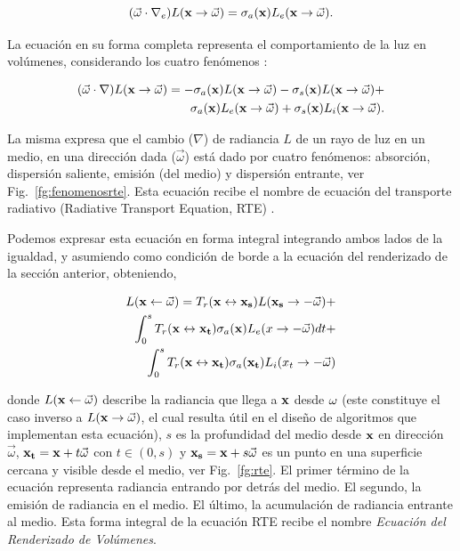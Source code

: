 $$ (\vec{\omega} \cdot \nabla_{e}) L(\bold{x} \rightarrow \vec{\omega}) = \sigma_{a}(\bold{x}) L_{e}(\bold{x} \rightarrow \vec{\omega}).$$

La ecuación en su forma completa representa el comportamiento de la luz en volúmenes, considerando los cuatro fenómenos \cite{Jarosz2008}:

\begin{equation}
\begin{aligned}
(\vec{\omega} \cdot \nabla) L(\bold{x} \rightarrow \vec{\omega}) = - \sigma_{a}(\bold{x}) L(\bold{x} \rightarrow \vec{\omega}) - \sigma_{s}(\bold{x}) L(\bold{x} \rightarrow \vec{\omega}) + \\
\sigma_{a}(\bold{x}) L_{e}(\bold{x} \rightarrow \vec{\omega}) + \sigma_{s}(\bold{x}) L_{i}(\bold{x} \rightarrow \vec{\omega}).
\end{aligned}
\label{eq:rte}
\end{equation}

La misma expresa que el cambio ($\nabla$) de radiancia $L$ de un rayo de luz en un medio, en una dirección dada ($\vec{\omega}$) está dado por cuatro fenómenos: absorción, dispersión saliente, emisión (del medio) y dispersión entrante, ver Fig.~\ref{fg:fenomenosrte}.
Esta ecuación recibe el nombre de ecuación del transporte radiativo (Radiative Transport Equation, \acrshort{RTE}) \cite{Chandrasekhar1960}.

Podemos expresar esta ecuación en forma integral integrando ambos lados de la igualdad, y asumiendo como condición de borde a la ecuación del renderizado de la sección anterior, obteniendo,

\begin{equation}
\begin{aligned}
L(\bold{x} \leftarrow \vec{\omega}) = T_{r}(\bold{x} \leftrightarrow \bold{x_{s}}) L(\bold{x_{s}} \rightarrow -\vec{\omega}) + \\
\int_{0}^{s}{T_{r}(\bold{x} \leftrightarrow \bold{x_{t}}) \sigma_{a}(\bold{x}) L_{e}(x \rightarrow -\vec{\omega}) dt } + \\
\int_{0}^{s}{T_{r}(\bold{x} \leftrightarrow \bold{x_{t}}) \sigma_{a}(\bold{x_{t}}) L_{i}(x_{t} \rightarrow -\vec{\omega})  }
\end{aligned}
\label{eq:rteintegral}
\end{equation}

\noindent donde $L(\bold{x} \leftarrow \vec{\omega})$ describe la radiancia que llega a $\bold{x}$ desde $\bold{\omega}$ (este constituye el caso inverso a $L(\bold{x} \rightarrow {\vec{\omega}})$, el cual resulta útil en el diseño de algoritmos que implementan esta ecuación), $s$ es la profundidad del medio desde $\bold{x}$ en dirección $\vec{\omega}$, $\bold{x_{t}} = \bold{x} + t\vec{\omega}$ con $t \in (0,s)$ y $\bold{x_{s}} = \bold{x}+ s\vec{\omega}$ es un punto en una superficie cercana y visible desde el medio, ver Fig.~\ref{fg:rte}.
El primer término de la ecuación representa radiancia entrando por detrás del medio.
El segundo, la emisión de radiancia en el medio.
El último, la acumulación de radiancia entrante al medio. 
Esta forma integral de la ecuación RTE recibe el nombre {\em Ecuación del Renderizado de Volúmenes}.

